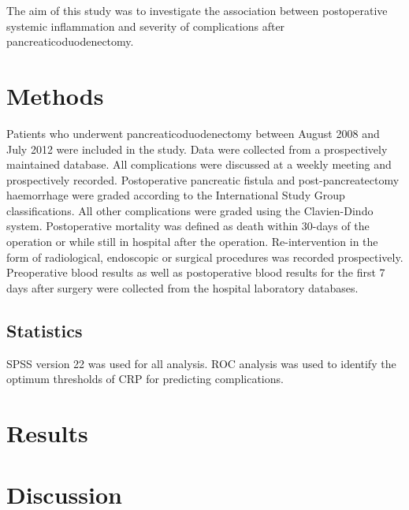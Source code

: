 The aim of this study was to investigate the association between postoperative systemic inflammation and severity of complications after pancreaticoduodenectomy.
 
 
\clearpage
\section{Methods}
Patients who underwent pancreaticoduodenectomy between August 2008 and July 2012 were included in the study. Data were collected from a prospectively maintained database. All complications were discussed at a weekly meeting and prospectively recorded. Postoperative pancreatic fistula and post-pancreatectomy haemorrhage were graded according to the International Study Group classifications. All other complications were graded using the Clavien-Dindo system. Postoperative mortality was defined as death within 30-days of the operation or while still in hospital after the operation. Re-intervention in the form of radiological, endoscopic or surgical procedures was recorded prospectively. Preoperative blood results as well as postoperative blood results for the first 7 days after surgery were collected from the hospital laboratory databases. 

\subsection{Statistics}
SPSS version 22 was used for all analysis. ROC analysis was used to identify the optimum thresholds of CRP for predicting complications.



\clearpage
\section{Results}



\clearpage
\section{Discussion}
